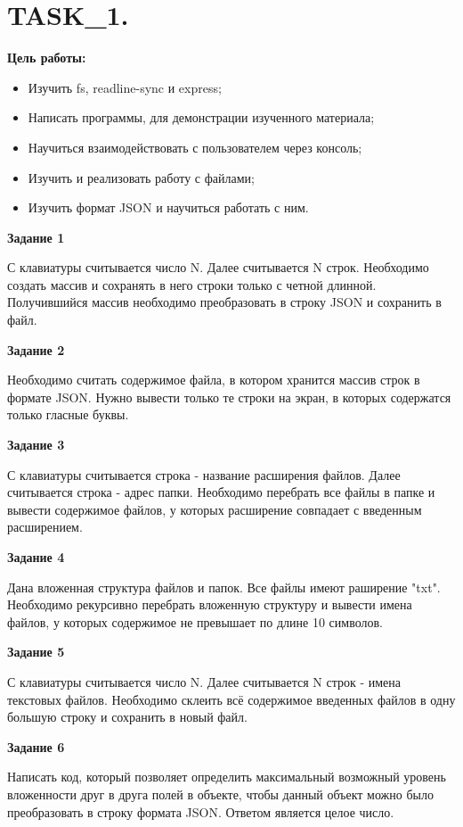 \chapter{TASK\_1.}

\textbf{Цель работы:}

\begin{itemize} 
	\item Изучить fs, readline-sync и express;
	\item Написать программы, для демонстрации изученного материала;
	\item Научиться взаимодействовать с пользователем через консоль;
	\item Изучить и реализовать работу с файлами;
	\item Изучить формат JSON и научиться работать с ним.
\end{itemize}

\textbf{Задание 1}

С клавиатуры считывается число N. Далее считывается N строк. Необходимо создать массив и сохранять в него строки только с четной длинной. Получившийся массив необходимо преобразовать в строку JSON и сохранить в файл.

\textbf{Задание 2}

Необходимо считать содержимое файла, в котором хранится массив строк в формате JSON. Нужно вывести только те строки на экран, в которых содержатся только гласные буквы.

\textbf{Задание 3}

С клавиатуры считывается строка - название расширения файлов. Далее считывается строка - адрес папки. Необходимо перебрать все файлы в папке и вывести содержимое файлов, у которых расширение совпадает с введенным расширением.

\textbf{Задание 4}

Дана вложенная структура файлов и папок. Все файлы имеют раширение "txt". Необходимо рекурсивно перебрать вложенную структуру и вывести имена файлов, у которых содержимое не превышает по длине 10 символов.

\textbf{Задание 5}

С клавиатуры считывается число N. Далее считывается N строк - имена текстовых файлов. Необходимо склеить всё содержимое введенных файлов в одну большую строку и сохранить в новый файл.

\textbf{Задание 6}

Написать код, который позволяет определить максимальный возможный уровень вложенности друг в друга полей в объекте, чтобы данный объект можно было преобразовать в строку формата JSON. Ответом является целое число.

